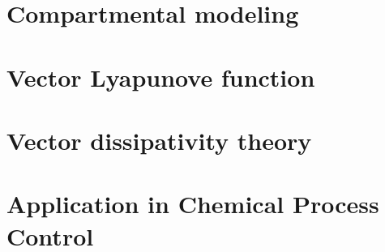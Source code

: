 \documentclass{paper}
\begin{document}
\section{Compartmental modeling}
\section{Vector Lyapunove function}
\section{Vector dissipativity theory}
\section{Application in Chemical Process Control}


\end{document}
